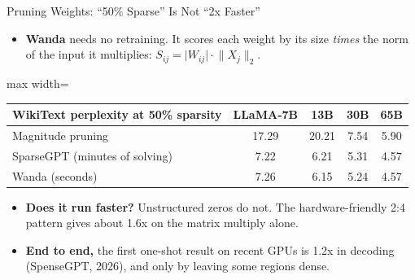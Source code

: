 \begin{frame}{Pruning Weights: ``50\% Sparse'' Is Not ``2x Faster''}
    \begin{itemize}\itemsep0.3em
        \item \textbf{Wanda} needs no retraining. It scores each weight by its size \emph{times} the norm of the input it multiplies:
        $S_{ij} = \lvert W_{ij}\rvert \cdot \lVert X_j\rVert_2$.
    \end{itemize}
    \begin{center}
    \small
    \begin{adjustbox}{max width=\linewidth}\begin{tabular}{lcccc}
        \toprule
        \textbf{WikiText perplexity at 50\% sparsity} & \textbf{LLaMA-7B} & \textbf{13B} & \textbf{30B} & \textbf{65B} \\
        \midrule
        Magnitude pruning & 17.29 & 20.21 & 7.54 & 5.90 \\
        SparseGPT (minutes of solving) & 7.22 & 6.21 & 5.31 & 4.57 \\
        \rowcolor{KAUSTcyan!12} Wanda (seconds) & 7.26 & 6.15 & 5.24 & 4.57 \\
        \bottomrule
    \end{tabular}\end{adjustbox}
    \end{center}
    \begin{itemize}\itemsep0.35em
        \item \textbf{Does it run faster?} Unstructured zeros do not. The hardware-friendly 2:4 pattern gives about 1.6x on the matrix multiply alone.
        \item \textbf{End to end,} the first one-shot result on recent GPUs is \alert{1.2x} in decoding (SpenseGPT, 2026), and only by leaving some regions dense.
    \end{itemize}
\end{frame}

